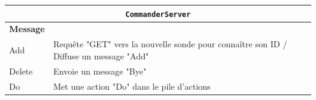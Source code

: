 \documentclass[a4paper,11pt]{article}
\newcommand{\cd}[1]{\texttt{#1}}
\begin{document}
\begin{center}
\begin{tabular}{|l|l|}
\hline
\multicolumn{2}{|c|}{\cd{CommanderServer}} \\
\hline
\textbf{Message} & \\
\hline
Add & Requête "GET" vers la nouvelle sonde pour connaître son ID / Diffuse un message "Add" \\
\hline
Delete & Envoie un message "Bye"\\
\hline
Do & Met une action "Do" dans le pile d'actions\\
\hline
\end{tabular}
\end{center}

\clearpage
{}
\renewcommand{\appendixpagename}{\centering{Annexe : Liste des fonctions Scilab}}
\renewcommand{\labelitemi}{$\bullet$}
\renewcommand{\labelitemiii}{$\cdot$}
\renewcommand{\labelitemii}{$\diamond$}
\renewcommand{\labelitemiv}{$\ast$}
\end{document}
